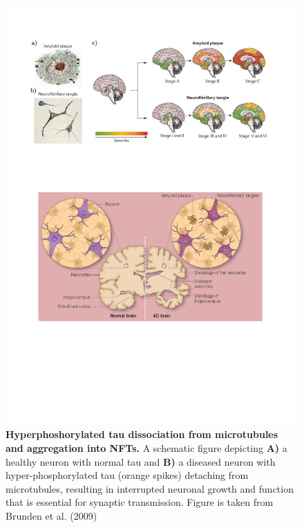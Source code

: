 \begin{figure}[!ht]
	\centering
	\includegraphics[page=13,trim={0 14cm 0cm 2cm},clip, scale = 0.6]{Figures/Introduction_Figures.pdf}
	\captionsetup{width=0.95\textwidth,singlelinecheck=off}
	\caption[Tau tangle hypothesis in AD]%
	{\textbf{Hyperphoshorylated tau dissociation from microtubules and aggregation into NFTs.} A schematic figure depicting \textbf{A)} a healthy neuron with normal tau and \textbf{B)} a diseased neuron with hyper-phosphorylated tau (orange spikes) detaching from microtubules, resulting in interrupted neuronal growth and function that is essential for synaptic transmission. Figure is taken from Brunden et al. (2009)\cite{Brunden2009}
	}
	\label{fig:tau_hypothesis}
\end{figure}	

